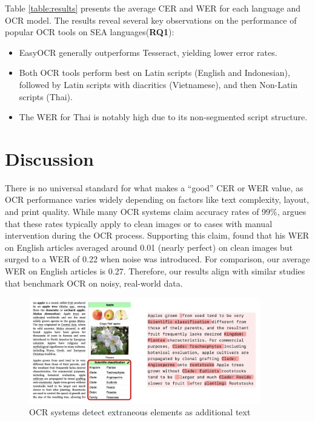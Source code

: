 \documentclass[12pt,oneside]{memoir}
\begin{document}
Table \ref{table:results} presents the average CER and WER for each language and 
OCR model. The results reveal several key observations on the performance of popular OCR tools on SEA languages(\textbf{RQ1}):

\begin{itemize}
    \item EasyOCR generally outperforms Tesseract, yielding lower error rates.
    \item Both OCR tools perform best on Latin scripts (English and Indonesian), followed by Latin scripts with diacritics (Vietnamese), and then Non-Latin scripts (Thai).
    \item The WER for Thai is notably high due to its non-segmented script structure.
\end{itemize}

\section{Discussion}
There is no universal standard for what makes a “good” CER or WER value, as OCR 
performance varies widely depending on factors like text complexity, layout, and 
print quality. While many OCR systems claim accuracy rates of 99\%, \textcite{holley-2009} argues 
that these rates typically apply to clean images or to cases with manual 
intervention during the OCR process. Supporting this claim, \textcite{hegghammer-2022} found that his 
WER on English articles averaged around 0.01 (nearly perfect) on clean images 
but surged to a WER of 0.22 when noise was introduced. For comparison, our 
average WER on English articles is 0.27. Therefore, our results align with 
similar studies that benchmark OCR on noisy, real-world data. 

\begin{figure}[ht]
    \centering
    \includegraphics[width=0.9\textwidth]{images/multimodal-content.png}
    \caption{OCR systems detect extraneous elements as additional text}
    \label{figure:multimodal-content}
\end{figure}
\end{document}
